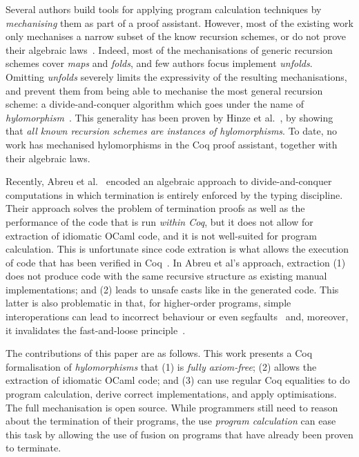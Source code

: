 \documentclass[a4paper,anonymous, UKenglish,cleveref, autoref, thm-restate]{lipics-v2021}
\newcommand{\dcas}[1]{\textcolor{ForestGreen}{\textsc{David}: #1}}
\begin{document}
Several authors build tools for applying program calculation techniques by
\emph{mechanising} them as part of a proof assistant. However, most of the
existing work only mechanises a narrow subset of the know recursion schemes, or
do not prove their algebraic
laws~\cite{10.1007/978-3-642-17796-5_10,MurataE19,larchey2022braga}.  Indeed,
most of the mechanisations of generic recursion schemes cover \emph{maps} and
\emph{folds}, and few authors focus implement \emph{unfolds}. Omitting
\emph{unfolds} severely limits the expressivity of the resulting mechanisations,
and prevent them from being able to mechanise the most general recursion scheme:
a divide-and-conquer algorithm which goes under the name of
\emph{hylomorphism}~\cite{MeijerFP91,HuIT96}. This generality has been proven by
Hinze et al.~\cite{HinzeWG15}, by showing that \emph{all known  recursion
schemes are instances of hylomorphisms}.  To date, no work has mechanised
hylomorphisms in the Coq proof assistant, together with their algebraic laws.

Recently, Abreu et al.~\cite{AbreuDHJMS23} encoded an algebraic approach to
divide-and-conquer computations in which termination is entirely enforced by the
typing discipline. Their approach solves the problem of termination proofs as
well as the performance of the code that is run \emph{within Coq}, but it does
not allow for extraction of idiomatic OCaml code, and it is not well-suited for
program calculation. This is unfortunate since code extration is what allows the
execution of code that has been verified in
Coq~\cite{OnoHTNH11,Larchey-Wendling23,MiculanP12,Sakaguchi20}.  In Abreu et
al's approach, extraction (1) does not produce code with the same recursive
structure  as existing manual implementations; and (2) leads to unsafe casts
like  in the generated code. This latter is also problematic in
that, for higher-order programs, simple interoperations can lead to incorrect
behaviour or even segfaults~\cite{forster:hal-04329663} and, moreover, it
invalidates the fast-and-loose principle~\cite{DanielssonHJG06}.

The contributions of this paper are as follows.  This work presents a Coq
formalisation of \emph{hylomorphisms} that (1) is \emph{fully axiom-free}; (2)
allows the extraction of idiomatic OCaml code; and (3) can use regular Coq
equalities to do program calculation, derive correct implementations, and apply
optimisations.  The full mechanisation is open source.
While programmers still need to reason about the termination of their programs,
the use \emph{program calculation} can ease this task by allowing the use of
fusion on programs that have already been proven to terminate.
\end{document}
